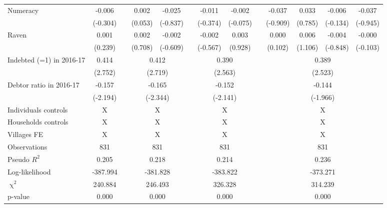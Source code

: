 \begin{table}[htbp]
{\begin{tabular}{lcccccccccccc}
    Numeracy & -0.006 &   & 0.002 & -0.025 &   & -0.011 & -0.002 &   & -0.037 & 0.033 & -0.006 & -0.037 \\
      & (-0.304) &   & (0.053) & (-0.837) &   & (-0.374) & (-0.075) &   & (-0.909) & (0.785) & (-0.134) & (-0.945) \\
    Raven & 0.001 &   & 0.002 & -0.002 &   & -0.002 & 0.003 &   & 0.000 & 0.006 & -0.004 & -0.000 \\
      & (0.239) &   & (0.708) & (-0.609) &   & (-0.567) & (0.928) &   & (0.102) & (1.106) & (-0.848) & (-0.103) \\
\cmidrule{1-2}\cmidrule{4-5}\cmidrule{7-8}\cmidrule{10-13}    Indebted (=1) in 2016-17 & 0.414 &       & \multicolumn{2}{c}{0.412} &       & \multicolumn{2}{c}{0.390} &       & \multicolumn{4}{c}{0.389} \\
          & (2.752) &       & \multicolumn{2}{c}{(2.719)} &       & \multicolumn{2}{c}{(2.563)} &       & \multicolumn{4}{c}{(2.523)} \\
    Debtor ratio in 2016-17 & -0.157 &       & \multicolumn{2}{c}{-0.165} &       & \multicolumn{2}{c}{-0.152} &       & \multicolumn{4}{c}{-0.144} \\
          & (-2.194) &       & \multicolumn{2}{c}{(-2.344)} &       & \multicolumn{2}{c}{(-2.141)} &       & \multicolumn{4}{c}{(-1.966)} \\
    Individuals controls & X     &       & \multicolumn{2}{c}{X} &       & \multicolumn{2}{c}{X} &       & \multicolumn{4}{c}{X} \\
    Households controls & X     &       & \multicolumn{2}{c}{X} &       & \multicolumn{2}{c}{X} &       & \multicolumn{4}{c}{X} \\
    Villages FE & X     &       & \multicolumn{2}{c}{X} &       & \multicolumn{2}{c}{X} &       & \multicolumn{4}{c}{X} \\
    \midrule
    Observations & 831   &       & \multicolumn{2}{c}{831} &       & \multicolumn{2}{c}{831} &       & \multicolumn{4}{c}{831} \\
    Pseudo $R^2$ & 0.205 &       & \multicolumn{2}{c}{0.218} &       & \multicolumn{2}{c}{0.214} &       & \multicolumn{4}{c}{0.236} \\
    Log-likelihood & -387.994 &       & \multicolumn{2}{c}{-381.828} &       & \multicolumn{2}{c}{-383.822} &       & \multicolumn{4}{c}{-373.271} \\
    $\upchi^2$ & 240.884 &       & \multicolumn{2}{c}{246.493} &       & \multicolumn{2}{c}{326.328} &       & \multicolumn{4}{c}{314.239} \\
    p-value & 0.000 &       & \multicolumn{2}{c}{0.000} &       & \multicolumn{2}{c}{0.000} &       & \multicolumn{4}{c}{0.000} \\
    \bottomrule
    \end{tabular}%
	}
  \label{tab:ame_indebt}%
\end{table}%
